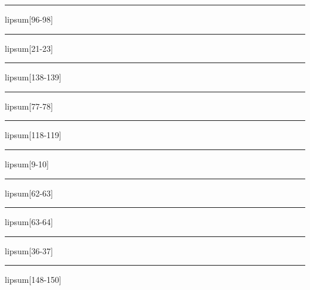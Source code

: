 \documentclass[11pt,a4paper]{article}
\begin{document}
\begin{simplewrap}
  \textcolor{cyan!59}{\rule{3.4cm}{7.1cm}}
\end{simplewrap}
lipsum[96-98]

\begin{simplewrap}
  \textcolor{pink!38}{\rule{5.6cm}{9.3cm}}
\end{simplewrap}
lipsum[21-23]

\begin{simplewrap}
  \textcolor{magenta!18}{\rule{5.0cm}{4.8cm}}
\end{simplewrap}
lipsum[138-139]

\begin{simplewrap}
  \textcolor{purple!56}{\rule{5.9cm}{8.7cm}}
\end{simplewrap}
lipsum[77-78]

\begin{simplewrap}
  \textcolor{magenta!37}{\rule{4.6cm}{8.6cm}}
\end{simplewrap}
lipsum[118-119]

\begin{simplewrap}
  \textcolor{teal!22}{\rule{5.8cm}{7.8cm}}
\end{simplewrap}
lipsum[9-10]

\begin{simplewrap}
  \textcolor{olive!49}{\rule{5.3cm}{9.1cm}}
\end{simplewrap}
lipsum[62-63]

\begin{simplewrap}
  \textcolor{orange!48}{\rule{3.1cm}{6.8cm}}
\end{simplewrap}
lipsum[63-64]

\begin{simplewrap}
  \textcolor{pink!38}{\rule{3.7cm}{3.7cm}}
\end{simplewrap}
lipsum[36-37]

\begin{simplewrap}
  \textcolor{violet!24}{\rule{5.4cm}{7.9cm}}
\end{simplewrap}
lipsum[148-150]
\end{document}

